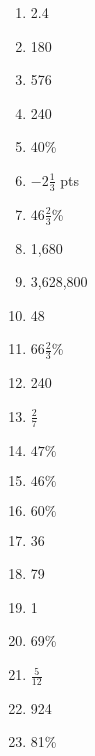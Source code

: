 \documentclass[../uilmath.tex]{subfiles}
\begin{document}
\begin{enumerate}[label=\bfseries\arabic*.]
    \item %
    2.4

    \item %
    180

    \item %
    576

    \item %
    240

    \item %
    40\%

    \item %
    $-2\frac{1}{3}$ pts 

    \item %
    $46\frac{2}{3}$\% 

    \item %
    1,680 

    \item %
    3,628,800

    \item %
    48 

    \item %
    $66\frac{2}{3}$\%

    \item %
    240

    \item %
    $\frac{2}{7}$

    \item %
    $47\%$

    \item %
    $46\%$

    \item %
    $60\%$

    \item %
    36 

    \item %
    79

    \item %
    1

    \item %
    69\%

    \item %
    $\frac{5}{12}$

    \item %
    924

    \item %
    81\%


\end{enumerate}
\end{document}
